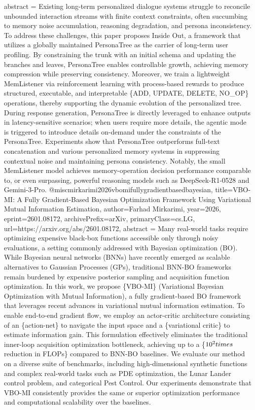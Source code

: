 {      abstract = {Existing long-term personalized dialogue systems struggle to reconcile unbounded interaction streams with finite context constraints, often succumbing to memory noise accumulation, reasoning degradation, and persona inconsistency. To address these challenges, this paper proposes Inside Out, a framework that utilizes a globally maintained PersonaTree as the carrier of long-term user profiling. By constraining the trunk with an initial schema and updating the branches and leaves, PersonaTree enables controllable growth, achieving memory compression while preserving consistency. Moreover, we train a lightweight MemListener via reinforcement learning with process-based rewards to produce structured, executable, and interpretable \{ADD, UPDATE, DELETE, NO_OP\} operations, thereby supporting the dynamic evolution of the personalized tree. During response generation, PersonaTree is directly leveraged to enhance outputs in latency-sensitive scenarios; when users require more details, the agentic mode is triggered to introduce details on-demand under the constraints of the PersonaTree. Experiments show that PersonaTree outperforms full-text concatenation and various personalized memory systems in suppressing contextual noise and maintaining persona consistency. Notably, the small MemListener model achieves memory-operation decision performance comparable to, or even surpassing, powerful reasoning models such as DeepSeek-R1-0528 and Gemini-3-Pro.}
}@misc{mirkarimi2026vbomifullygradientbasedbayesian,
      title={VBO-MI: A Fully Gradient-Based Bayesian Optimization Framework Using Variational Mutual Information Estimation}, 
      author={Farhad Mirkarimi},
      year={2026},
      eprint={2601.08172},
      archivePrefix={arXiv},
      primaryClass={cs.LG},
      url={https://arxiv.org/abs/2601.08172},
      abstract = {Many real-world tasks require optimizing expensive black-box functions accessible only through noisy evaluations, a setting commonly addressed with Bayesian optimization (BO). While Bayesian neural networks (BNNs) have recently emerged as scalable alternatives to Gaussian Processes (GPs), traditional BNN-BO frameworks remain burdened by expensive posterior sampling and acquisition function optimization. In this work, we propose \{VBO-MI\} (Variational Bayesian Optimization with Mutual Information), a fully gradient-based BO framework that leverages recent advances in variational mutual information estimation. To enable end-to-end gradient flow, we employ an actor-critic architecture consisting of an \{action-net\} to navigate the input space and a \{variational critic\} to estimate information gain. This formulation effectively eliminates the traditional inner-loop acquisition optimization bottleneck, achieving up to a \{$10^2 \\times$ reduction in FLOPs\} compared to BNN-BO baselines. We evaluate our method on a diverse suite of benchmarks, including high-dimensional synthetic functions and complex real-world tasks such as PDE optimization, the Lunar Lander control problem, and categorical Pest Control. Our experiments demonstrate that VBO-MI consistently provides the same or superior optimization performance and computational scalability over the baselines.}
}
